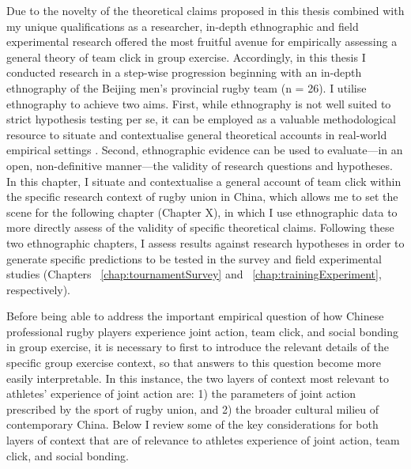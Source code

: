 \begin{CJK}{UTF8}{gbsn}
Due to the novelty of the theoretical claims proposed in this thesis combined with my unique qualifications as a researcher, in-depth ethnographic and field experimental research offered the most fruitful avenue for empirically assessing a general theory of team click in group exercise.  Accordingly, in this thesis I conducted research in a step-wise progression beginning with an in-depth ethnography of the Beijing men’s provincial rugby team (n = 26).  I utilise ethnography to achieve two aims.  First, while ethnography is not well suited to strict hypothesis testing per se, it can be employed as a valuable methodological resource to situate and contextualise general theoretical accounts in real-world empirical settings \citep{Whitehouse2012,Fuentes2016}.  Second, ethnographic evidence can be used to evaluate---in an open, non-definitive manner---the validity of research questions and hypotheses.  In this chapter, I situate and contextualise a general account of team click within the specific research context of rugby union in China, which allows me to set the scene for the following chapter (Chapter X), in which I use ethnographic data to more directly assess of the validity of specific theoretical claims.  Following these two ethnographic chapters, I assess results against research hypotheses in order to generate specific predictions to be tested in the survey and field experimental studies (Chapters ~\ref{chap:tournamentSurvey} and ~\ref{chap:trainingExperiment}, respectively).



Before being able to address the important empirical question of how Chinese professional rugby players experience joint action, team click, and social bonding in group exercise, it is necessary to first to introduce the relevant details of the specific group exercise context, so that answers to this question become more easily interpretable.  In this instance, the two layers of context most relevant to athletes’ experience of joint action are: 1) the parameters of joint action prescribed by the sport of rugby union, and 2) the broader cultural milieu of contemporary China.  Below I review some of the key considerations for both layers of context that are of relevance to athletes experience of joint action, team click, and social bonding.


\end{CJK}
